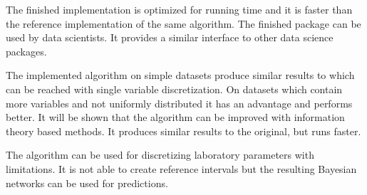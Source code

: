 The finished implementation is optimized for running time and it is faster than the reference implementation of the same algorithm. The finished package can be used by data scientists. It provides a similar interface to other data science packages.

The implemented algorithm on simple datasets produce similar results to which can be reached with single variable discretization. On datasets which contain more variables and not uniformly distributed it has an advantage and performs better. It will be shown that the algorithm can be improved with information theory based methods. It produces similar results to the original, but runs faster.

The algorithm can be used for discretizing laboratory parameters with limitations. It is not able to create reference intervals but the resulting Bayesian networks can be used for predictions.

\vfill
\selectthesislanguage

\setcounter{romanPage}{\value{page}}
